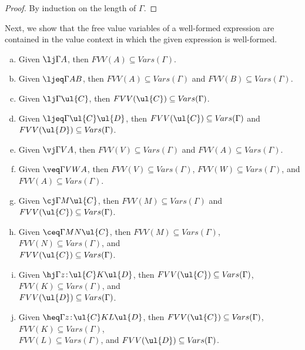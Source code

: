 \begin{proof}
By induction on the length of $\Gamma$. 
\end{proof}

Next, we show that the free value variables of a well-formed expression are contained in the value context in which the given expression is well-formed.


\begin{proposition} \mbox{}
\label{prop:freevariablesofwellformedexpressions}
\begin{enumerate}[(a)]
\item Given $\lj \Gamma A$, then $FVV(A) \subseteq V\!ars(\Gamma)$.
\item Given $\ljeq \Gamma A B$, then $FVV(A) \subseteq V\!ars(\Gamma)$ and $FVV(B) \subseteq V\!ars(\Gamma)$.
\item Given $\lj \Gamma \ul{C}$, then $FVV(\ul{C}) \subseteq V\!ars(\Gamma)$.
\item Given $\ljeq \Gamma {\ul{C}} {\ul{D}}$, then $FVV(\ul{C}) \subseteq V\!ars(\Gamma)$ and $FVV(\ul{D}) \subseteq V\!ars(\Gamma)$.
\item Given $\vj \Gamma V A$, then $FVV(V) \subseteq V\!ars(\Gamma)$ and $FVV(A) \subseteq V\!ars(\Gamma)$.
\item Given $\veq \Gamma V W A$, then $FVV(V) \subseteq V\!ars(\Gamma)$, $FVV(W) \subseteq V\!ars(\Gamma)$, and \\$FVV(A) \subseteq V\!ars(\Gamma)$.
\item Given $\cj \Gamma M \ul{C}$, then $FVV(M) \subseteq V\!ars(\Gamma)$ and $FVV(\ul{C}) \subseteq V\!ars(\Gamma)$.
\item Given $\ceq \Gamma M N \ul{C}$, then $FVV(M) \subseteq V\!ars(\Gamma)$, $FVV(N) \subseteq V\!ars(\Gamma)$, and \\ $FVV(\ul{C}) \subseteq V\!ars(\Gamma)$.
\item Given $\hj \Gamma {z \!:\! \ul{C}} K \ul{D}$, then $FVV(\ul{C}) \subseteq V\!ars(\Gamma)$, $FVV(K) \subseteq V\!ars(\Gamma)$, and \\ $FVV(\ul{D}) \subseteq V\!ars(\Gamma)$.
\item Given $\heq \Gamma {z \!:\! \ul{C}} K L \ul{D}$, then $FVV(\ul{C}) \subseteq V\!ars(\Gamma)$, $FVV(K) \subseteq V\!ars(\Gamma)$, \\ $FVV(L) \subseteq V\!ars(\Gamma)$, and $FVV(\ul{D}) \subseteq V\!ars(\Gamma)$.
\end{enumerate}
\end{proposition}

